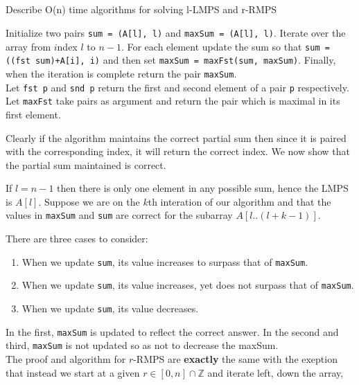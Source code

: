 \documentclass{amsart}
\theoremstyle{definition}
\theoremstyle{remark}
\numberwithin{equation}{section}
\newcommand{\ZZ}{\mathbb Z}
\begin{document}
\subsection{} Describe O(n) time algorithms for solving l-LMPS and r-RMPS


Initialize two pairs \texttt{sum = (A[l], l)} and \texttt{maxSum = (A[l], l)}. Iterate over
the array from $i$ndex $l$ to $n-1$. For each element update the sum so that
\texttt{sum = ((fst\ sum)+A[i], i)} and then set \texttt{maxSum = maxFst(sum, maxSum)}. Finally,
when the iteration is complete return the pair \texttt{maxSum}. \\

\rmk
Let \texttt{fst p} and \texttt{snd p} return the first and second element of a pair \texttt{p} respectively.
Let \texttt{maxFst} take pairs as argument and return the pair which is maximal in its first element.

\proof
Clearly if the algorithm maintains the correct partial sum then since it is paired with
the corresponding index, it will return the correct index. We now show that the partial sum
maintained is correct.

If $l=n-1$ then there is only one element in any possible sum, hence the
LMPS is $A[l]$.
Suppose we are on the $k$th interation of our algorithm and that the
values in \texttt{maxSum} and \texttt{sum} are correct for the subarray $A[l..(l+k-1)]$.

There are three cases to consider:

\begin{enumerate}
  \item When we update \texttt{sum}, its value increases to surpass that of \texttt{maxSum}.
  \item When we update \texttt{sum}, its value increases, yet does not surpass that of \texttt{maxSum}.
  \item When we update \texttt{sum}, its value decreases.
\end{enumerate}

In the first, \texttt{maxSum} is updated to reflect the correct answer.
In the second and third, \texttt{maxSum} is not updated so as not to decrease the maxSum. \\

The proof and algorithm for $r$-RMPS are \textbf{exactly} the same with the exeption that instead
we start at a given $r \in [0,n] \cap \ZZ$ and iterate left, down the array,
\end{document}

